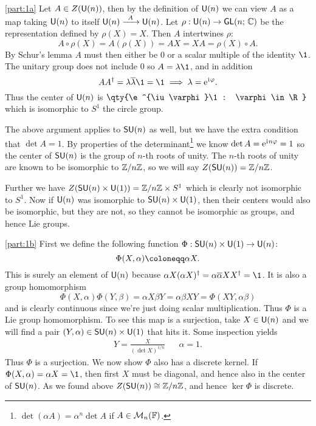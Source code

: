 \documentclass[
	pages,
	boxes,
	color=WildStrawberry
]{homework}
\theoremstyle{plain}
\begin{document}
\begin{solution}
	\ref{part:1a}
	Let $A\in Z(\mathsf{U}(n))$, then by the definition of $\mathsf{U}(n)$ we can view $A$ as a map taking $\mathsf{U}(n)$ to itself $\mathsf{U}(n)\xrightarrow{\,\,\, A\,\,\,} \mathsf{U}(n)$. Let $\rho: \mathsf{U}(n)\to \mathsf{GL}(n;\, \mathbb{C})$ be the representation defined by $\rho(X) = X$. Then $A$ intertwines $\rho$:
	\begin{equation*}
		A\circ\rho(X) = A(\rho(X)) = AX = XA = \rho(X)\circ A.
	\end{equation*}
	By Schur's lemma $A$ must then either be $0$ or a scalar multiple of the identity $\1$. The unitary group does not include $0$ so $A = \lambda \1$, and in addition
	\begin{equation*}
		AA^\dagger = \lambda \overline{\lambda}\1 = \1 \implies \lambda = \e^{\iu \varphi}.
	\end{equation*}
	Thus the center of $\mathsf{U}(n)$ is $\qty{\e^{\iu\varphi}\1 : \varphi\in\R}$ which is isomorphic to $S^1$ the circle group.

	The above argument applies to $\mathsf{SU}(n)$ as well, but we have the extra condition that $\det A = 1$. By properties of the determinant\footnote{$\det(\alpha A) = \alpha^n\det A$ if $A\in\mathcal{M}_{n}(\mathbb{F})$.} we know $\det A = \mathrm{e}^{\mkern1mu\mathrm{i}\mkern1mu n\varphi} = 1$ so the center of $\mathsf{SU}(n)$ is the group of $n$-th roots of unity. The $n$-th roots of unity are known to be isomorphic to $\mathbb{Z}/n\mathbb{Z}$, so we will say $Z(\mathsf{SU}(n)) = \mathbb{Z}/n\mathbb{Z}$.

	Further we have $Z(\mathsf{SU}(n)\times \mathsf{U}(1)) = \mathbb{Z}/n\mathbb{Z}\times S^1$ which is clearly not isomorphic to $S^1$. Now if $\mathsf{U}(n)$ was isomorphic to $\mathsf{SU}(n)\times\mathsf{U}(1)$, then their centers would also be isomorphic, but they are not, so they cannot be isomorphic as groups, and hence Lie groups.

	\ref{part:1b}
	First we define the following function $\Phi: \mathsf{SU}(n)\times\mathsf{U}(1)\to \mathsf{U}(n)$:
	\begin{equation*}
		\Phi(X, \alpha) \defeq \alpha X.
	\end{equation*}
	This is surely an element of $\mathsf{U}(n)$ because $\alpha X (\alpha X)^\dagger = \alpha\overline{\alpha}XX^\dagger = \1$. It is also a group homomorphism
	\begin{equation*}
		\Phi(X, \alpha)\Phi(Y, \beta) = \alpha X \beta Y = \alpha\beta XY = \Phi(XY, \alpha\beta)
	\end{equation*}
	and is clearly continuous since we're just doing scalar multiplication. Thus $\Phi$ is a Lie group homomorphism. To see this map is a surjection, take $X\in\mathsf{U}(n)$ and we will find a pair $(Y, \alpha)\in\mathsf{SU}(n)\times\mathsf{U}(1)$ that hits it. Some inspection yields
	\begin{align*}
		Y = \frac{X}{(\det X)^{1/n}} &  & \alpha = 1.
	\end{align*}
	Thus $\Phi$ is a surjection. We now show $\Phi$ also has a discrete kernel. If $\Phi(X, \alpha) = \alpha X = \1$, then first $X$ must be diagonal, and hence also in the center of $\mathsf{SU}(n)$. As we found above $Z(\mathsf{SU}(n))\cong\mathbb{Z}/n\mathbb{Z}$, and hence $\ker\Phi$ is discrete.


\end{solution}
\end{document}
